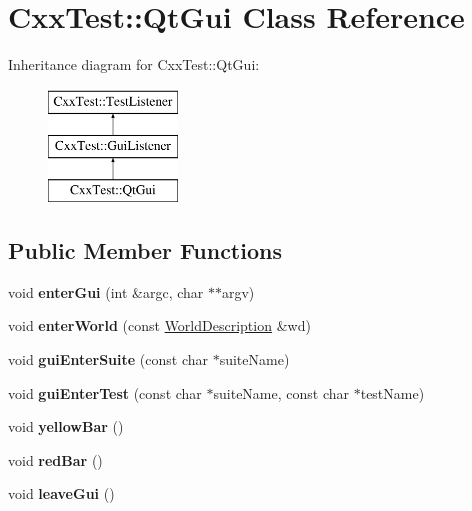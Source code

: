 \hypertarget{classCxxTest_1_1QtGui}{\section{Cxx\-Test\-:\-:Qt\-Gui Class Reference}
\label{classCxxTest_1_1QtGui}
}
Inheritance diagram for Cxx\-Test\-:\-:Qt\-Gui\-:\begin{figure}[H]
\begin{center}
\leavevmode
\includegraphics[height=3.000000cm]{classCxxTest_1_1QtGui}
\end{center}
\end{figure}
\subsection*{Public Member Functions}
\begin{DoxyCompactItemize}
\item 
\hypertarget{classCxxTest_1_1QtGui_a66796f2a04e7634ca5dded000aac2f5e}{void {\bfseries enter\-Gui} (int \&argc, char $\ast$$\ast$argv)}\label{classCxxTest_1_1QtGui_a66796f2a04e7634ca5dded000aac2f5e}

\item 
\hypertarget{classCxxTest_1_1QtGui_a8e93d3f7d715cb51c5b400758e1407ce}{void {\bfseries enter\-World} (const \hyperlink{classCxxTest_1_1WorldDescription}{World\-Description} \&wd)}\label{classCxxTest_1_1QtGui_a8e93d3f7d715cb51c5b400758e1407ce}

\item 
\hypertarget{classCxxTest_1_1QtGui_a30cdc6c47a861553c411c095a0e097a4}{void {\bfseries gui\-Enter\-Suite} (const char $\ast$suite\-Name)}\label{classCxxTest_1_1QtGui_a30cdc6c47a861553c411c095a0e097a4}

\item 
\hypertarget{classCxxTest_1_1QtGui_acf87800fc3e3bf7d2519f8c1d2c9d77f}{void {\bfseries gui\-Enter\-Test} (const char $\ast$suite\-Name, const char $\ast$test\-Name)}\label{classCxxTest_1_1QtGui_acf87800fc3e3bf7d2519f8c1d2c9d77f}

\item 
\hypertarget{classCxxTest_1_1QtGui_a1856e88c7c455783de79066ead4dca55}{void {\bfseries yellow\-Bar} ()}\label{classCxxTest_1_1QtGui_a1856e88c7c455783de79066ead4dca55}

\item 
\hypertarget{classCxxTest_1_1QtGui_aad2d92c46fd804c5656a82b96e6b600b}{void {\bfseries red\-Bar} ()}\label{classCxxTest_1_1QtGui_aad2d92c46fd804c5656a82b96e6b600b}

\item 
\hypertarget{classCxxTest_1_1QtGui_aca2ecfad186d2e02fb35ee57c18ead7d}{void {\bfseries leave\-Gui} ()}\label{classCxxTest_1_1QtGui_aca2ecfad186d2e02fb35ee57c18ead7d}

\end{DoxyCompactItemize}
